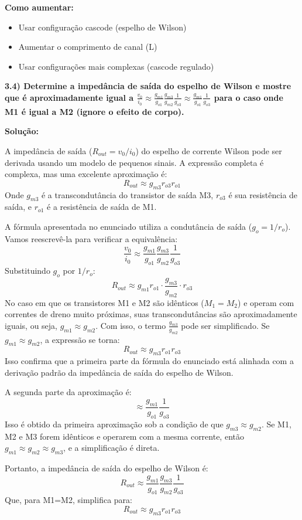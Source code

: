 ﻿\documentclass[12pt,a4paper]{article}
\begin{document}
\textbf{Como aumentar:}
\begin{itemize}
    \item Usar configuração cascode (espelho de Wilson)
    \item Aumentar o comprimento de canal (L)
    \item Usar configurações mais complexas (cascode regulado)
\end{itemize}

\textbf{3.4) Determine a impedância de saída do espelho de Wilson e mostre que é aproximadamente igual a $\frac{v_{0}}{i_{0}} \approx \frac{g_{m1}}{g_{o1}} \frac{g_{m3}}{g_{m2}} \frac{1}{g_{o3}} \approx \frac{g_{m1}}{g_{o1}} \frac{1}{g_{o3}}$ para o caso onde M1 é igual a M2 (ignore o efeito de corpo).}

\textbf{Solução:}

A impedância de saída ($R_{out} = v_0/i_0$) do espelho de corrente Wilson pode ser derivada usando um modelo de pequenos sinais. A expressão completa é complexa, mas uma excelente aproximação é:
$$ R_{out} \approx g_{m3}r_{o3}r_{o1} $$
Onde $g_{m3}$ é a transcondutância do transistor de saída M3, $r_{o3}$ é sua resistência de saída, e $r_{o1}$ é a resistência de saída de M1.

A fórmula apresentada no enunciado utiliza a condutância de saída ($g_o = 1/r_o$). Vamos reescrevê-la para verificar a equivalência:
$$ \frac{v_{0}}{i_{0}} \approx \frac{g_{m1}}{g_{o1}} \frac{g_{m3}}{g_{m2}} \frac{1}{g_{o3}} $$
Substituindo $g_o$ por $1/r_o$:
$$ R_{out} \approx g_{m1} r_{o1} \cdot \frac{g_{m3}}{g_{m2}} \cdot r_{o3} $$
No caso em que os transistores M1 e M2 são idênticos ($M_1 = M_2$) e operam com correntes de dreno muito próximas, suas transcondutâncias são aproximadamente iguais, ou seja, $g_{m1} \approx g_{m2}$. Com isso, o termo $\frac{g_{m3}}{g_{m2}}$ pode ser simplificado. Se $g_{m1} \approx g_{m2}$, a expressão se torna:
$$ R_{out} \approx g_{m3} r_{o1} r_{o3} $$
Isso confirma que a primeira parte da fórmula do enunciado está alinhada com a derivação padrão da impedância de saída do espelho de Wilson.

A segunda parte da aproximação é:
$$ \approx \frac{g_{m1}}{g_{o1}} \frac{1}{g_{o3}} $$
Isso é obtido da primeira aproximação sob a condição de que $g_{m3} \approx g_{m2}$. Se M1, M2 e M3 forem idênticos e operarem com a mesma corrente, então $g_{m1} \approx g_{m2} \approx g_{m3}$, e a simplificação é direta.

Portanto, a impedância de saída do espelho de Wilson é:
$$ \boxed{R_{out} \approx \frac{g_{m1}}{g_{o1}} \frac{g_{m3}}{g_{m2}} \frac{1}{g_{o3}}} $$
Que, para M1=M2, simplifica para:
$$ \boxed{R_{out} \approx g_{m3}r_{o1}r_{o3}} $$
\end{document}
